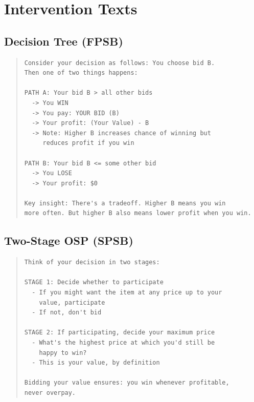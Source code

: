 \documentclass[12pt]{article}
\begin{document}
\section{Intervention Texts}

\subsection{Decision Tree (FPSB)}
\begin{quote}
\begin{verbatim}
Consider your decision as follows: You choose bid B.
Then one of two things happens:

PATH A: Your bid B > all other bids
  -> You WIN
  -> You pay: YOUR BID (B)
  -> Your profit: (Your Value) - B
  -> Note: Higher B increases chance of winning but
     reduces profit if you win

PATH B: Your bid B <= some other bid
  -> You LOSE
  -> Your profit: $0

Key insight: There's a tradeoff. Higher B means you win
more often. But higher B also means lower profit when you win.
\end{verbatim}
\end{quote}

\subsection{Two-Stage OSP (SPSB)}
\begin{quote}
\begin{verbatim}
Think of your decision in two stages:

STAGE 1: Decide whether to participate
  - If you might want the item at any price up to your
    value, participate
  - If not, don't bid

STAGE 2: If participating, decide your maximum price
  - What's the highest price at which you'd still be
    happy to win?
  - This is your value, by definition

Bidding your value ensures: you win whenever profitable,
never overpay.
\end{verbatim}
\end{quote}



\end{document}
